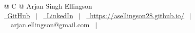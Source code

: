 \documentclass[a4paper,12pt]{article}
\begin{document}
\pagestyle{empty} 



\begin{tabularx}{\linewidth}{@{} C @{}}
\Huge{Arjan Singh Ellingson} \\[7.5pt]
\href{https://github.com/asellingson28}{\raisebox{-0.05\height}\faGithub\ GitHub} \ $|$ \ 
\href{https://www.linkedin.com/in/arjan-singh-ellingson/}{\raisebox{-0.05\height}\faLinkedin\ LinkedIn} \ $|$ \ 
\href{https://asellingson28.github.io/}{\raisebox{-0.05\height}\faGlobe \ https://asellingson28.github.io/} \ $|$ \ 
\href{mailto:arjan.ellingson@gmail.com}{\raisebox{-0.05\height}\faEnvelope \ arjan.ellingson@gmail.com} \ $|$ \ 
\end{tabularx}

\end{document}
